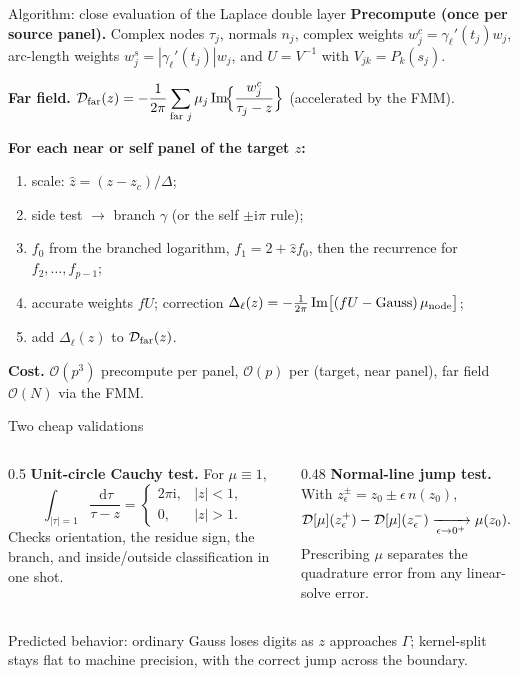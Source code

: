 \documentclass[aspectratio=169,11pt]{beamer}
\newcommand{\cO}{\mathcal{O}}
\newcommand{\dd}{\,\mathrm d}
\newcommand{\ii}{\mathrm i}
\begin{document}
\begin{frame}{Algorithm: close evaluation of the Laplace double layer}
\footnotesize
\textbf{Precompute (once per source panel).}  Complex nodes $\tau_j$, normals
$n_j$, complex weights $w^c_j=\gamma_\ell'(t_j)w_j$, arc-length weights
$w^s_j=|\gamma_\ell'(t_j)|w_j$, and $U=V^{-1}$ with $V_{jk}=P_k(s_j)$.

\medskip
\textbf{Far field.}
$\displaystyle
\mathcal{D}_{\rm far}(z)=-\frac{1}{2\pi}\sum_{\text{far }j}\mu_j\operatorname{Im}\!\Bigl\{\frac{w^c_j}{\tau_j-z}\Bigr\}$
\; (accelerated by the FMM).

\medskip
\textbf{For each near or self panel of the target $z$:}
\begin{enumerate}
  \item scale: $\hat z=(z-z_c)/\Delta$;
  \item side test $\to$ branch $\gamma$ (or the self $\pm\ii\pi$ rule);
  \item $f_0$ from the branched logarithm, $f_1=2+\hat z f_0$, then the
  recurrence for $f_2,\ldots,f_{p-1}$;
  \item accurate weights $fU$; correction
  $\Delta_\ell(z)=-\tfrac{1}{2\pi}\operatorname{Im}\bigl[(fU-\text{Gauss})\,\mu_{\rm node}\bigr]$;
  \item add $\Delta_\ell(z)$ to $\mathcal{D}_{\rm far}(z)$.
\end{enumerate}

\medskip
\textbf{Cost.}  $\cO(p^3)$ precompute per panel, $\cO(p)$ per (target, near
panel), far field $\cO(N)$ via the FMM.
\end{frame}

\begin{frame}{Two cheap validations}
\small
\begin{columns}[T,totalwidth=\textwidth]
\begin{column}{0.5\textwidth}
\textbf{Unit-circle Cauchy test.}  For $\mu\equiv1$,
\[
  \int_{|\tau|=1}\frac{\dd\tau}{\tau-z}=
  \begin{cases}2\pi\ii,&|z|<1,\\[2pt]0,&|z|>1.\end{cases}
\]
Checks orientation, the residue sign, the branch, and inside/outside
classification in one shot.
\end{column}
\begin{column}{0.48\textwidth}
\textbf{Normal-line jump test.}  With $z_\epsilon^\pm=z_0\pm\epsilon\, n(z_0)$,
\[
  \mathcal{D}[\mu](z_\epsilon^+)-\mathcal{D}[\mu](z_\epsilon^-)\xrightarrow[\epsilon\to0^+]{}\mu(z_0).
\]
Prescribing $\mu$ separates the quadrature error from any linear-solve error.
\end{column}
\end{columns}

\vspace{2mm}
Predicted behavior: ordinary Gauss loses digits as $z$ approaches $\Gamma$;
kernel-split stays flat to machine precision, with the correct jump across the
boundary.
\end{frame}
\end{document}
